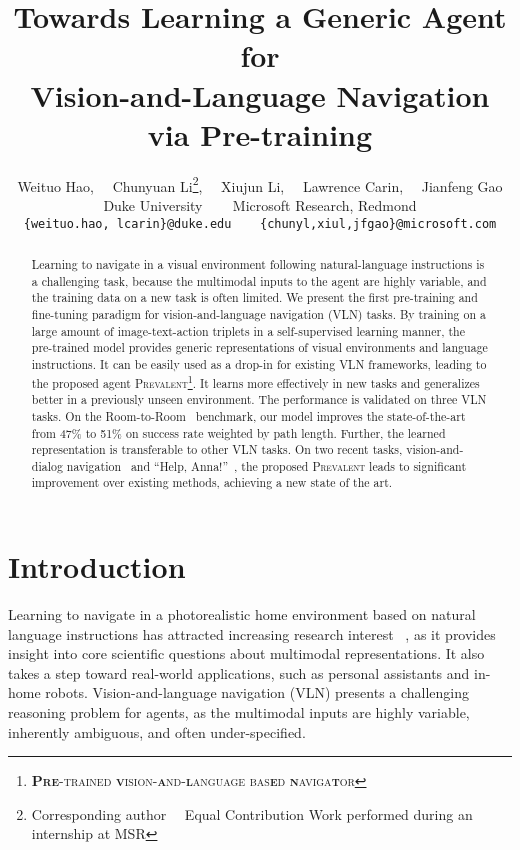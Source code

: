 \documentclass[10pt,twocolumn,letterpaper]{article}
\newcommand{\fullname}{\textsc{\textbf{Pre}-trained \textbf{v}ision-\textbf{a}nd-\textbf{l}anguage bas\textbf{e}d \textbf{n}aviga\textbf{t}or }}
\newcommand{\short}{\textsc{Prevalent}}
\begin{document}
\title{Towards Learning a Generic Agent for\\Vision-and-Language Navigation via Pre-training}

\author{
Weituo Hao,~~ Chunyuan Li\thanks{Corresponding author~~ Equal Contribution \hspace{1mm} Work performed during an internship at MSR}, ~~Xiujun Li, ~~Lawrence Carin,  ~~Jianfeng Gao \\ Duke University ~~~ Microsoft Research, Redmond \\
{\tt\small \{weituo.hao, lcarin\}@duke.edu~~~ \{chunyl,xiul,jfgao\}@microsoft.com}
}

\maketitle


\begin{abstract}
Learning to navigate in a visual environment following natural-language instructions is a challenging task, because the multimodal inputs to the agent are highly variable, and the training data on a new task is often limited. We present the first pre-training and fine-tuning paradigm for vision-and-language navigation (VLN) tasks. By training on a large amount of image-text-action triplets in a self-supervised learning manner, the pre-trained model provides generic representations of visual environments and language instructions. It can be easily used as a drop-in for existing VLN frameworks, leading to the proposed agent \short{}\footnote{\fullname}. It learns more effectively in new tasks and generalizes better in a previously unseen environment. The performance is validated on three VLN tasks. On the Room-to-Room~\cite{anderson2018vision} benchmark, our model improves the state-of-the-art from 47\% to 51\% on success rate weighted by path length. Further, the learned representation is transferable to other VLN tasks. On two recent tasks, vision-and-dialog navigation~\cite{thomason2019vision} and ``Help, Anna!''~\cite{nguyen2019help}, the proposed \short{} leads to significant improvement over existing methods, achieving a new state of the art.
\end{abstract}

\section{Introduction}
Learning to navigate in a photorealistic home environment based on natural language instructions has attracted increasing research interest ~\cite{savva2017minos,kolve2017ai2,das2018embodied,anderson2018vision,chen2019touchdown}, as it provides insight into core scientific questions about multimodal representations. It also takes a step toward real-world applications, such as personal assistants and in-home robots.
Vision-and-language navigation (VLN) presents a challenging reasoning problem for agents, as the multimodal inputs are highly variable, inherently ambiguous, and often under-specified. 
\end{document}
